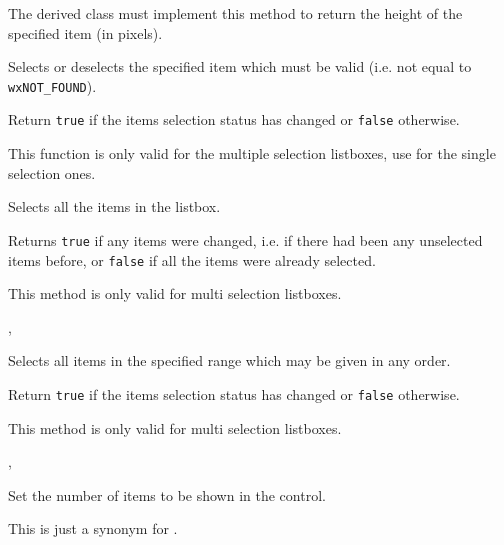 The derived class must implement this method to return the height of the
specified item (in pixels).


\label{wxvlistboxselect}


Selects or deselects the specified item which must be valid (i.e. not
equal to {\tt wxNOT\_FOUND}).

Return {\tt true} if the items selection status has changed or {\tt false}
otherwise.

This function is only valid for the multiple selection listboxes, use 
 for the single selection ones.


\label{wxvlistboxselectall}


Selects all the items in the listbox.

Returns {\tt true} if any items were changed, i.e. if there had been any
unselected items before, or {\tt false} if all the items were already selected.

This method is only valid for multi selection listboxes.


, 


\label{wxvlistboxselectrange}


Selects all items in the specified range which may be given in any order.

Return {\tt true} if the items selection status has changed or {\tt false}
otherwise.

This method is only valid for multi selection listboxes.


, 

\label{wxvlistboxsetitemcount}


Set the number of items to be shown in the control.

This is just a synonym for
.


